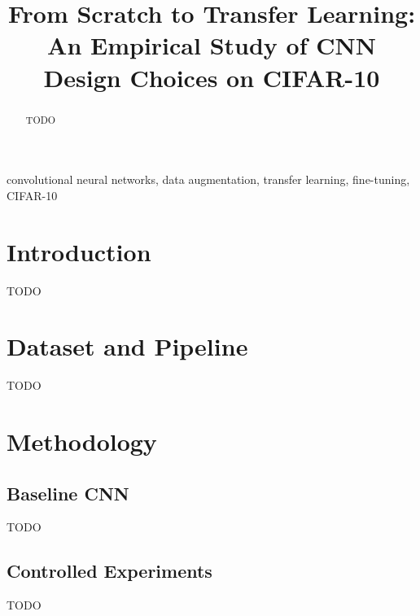 \documentclass[conference]{IEEEtran}
\begin{document}
\title{From Scratch to Transfer Learning: An Empirical Study of CNN Design Choices on CIFAR-10}

\author{
}

\maketitle

\begin{abstract}
TODO
\end{abstract}

\begin{IEEEkeywords}
convolutional neural networks, data augmentation, transfer learning, fine-tuning, CIFAR-10
\end{IEEEkeywords}

\section{Introduction}
TODO

\section{Dataset and Pipeline}
TODO

\section{Methodology}
\subsection{Baseline CNN}
TODO

\subsection{Controlled Experiments}
TODO
\end{document}
